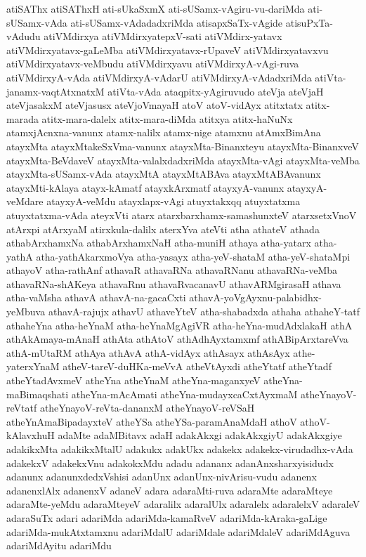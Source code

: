 {atiSAThx
atiSAThxH
ati-sUkaSxmX
ati-sUSamx-vAgiru-vu-dariMda
ati-sUSamx-vAda
ati-sUSamx-vAdadadxriMda
atisapxSaTx-vAgide
atisuPxTa-vAdudu
atiVMdirxya
atiVMdirxyatepxV-sati
atiVMdirx-yatavx
atiVMdirxyatavx-gaLeMba
atiVMdirxyatavx-rUpaveV
atiVMdirxyatavxvu
atiVMdirxyatavx-veMbudu
atiVMdirxyavu
atiVMdirxyA-vAgi-ruva
atiVMdirxyA-vAda
atiVMdirxyA-vAdarU
atiVMdirxyA-vAdadxriMda
atiVta-janamx-vaqtAtxnatxM
atiVta-vAda
ataqpitx-yAgiruvudo
ateVja
ateVjaH
ateVjasakxM
ateVjasusx
ateVjoVmayaH
atoV
atoV-vidAyx
atitxtatx
atitx-marada
atitx-mara-dalelx
atitx-mara-diMda
atitxya
atitx-haNuNx
atamxjAcnxna-vanunx
atamx-nalilx
atamx-nige
atamxnu
atAmxBimAna
atayxMta
atayxMtakeSxVma-vanunx
atayxMta-Binanxteyu
atayxMta-BinanxveV
atayxMta-BeVdaveV
atayxMta-valalxdadxriMda
atayxMta-vAgi
atayxMta-veMba
atayxMta-sUSamx-vAda
atayxMtA
atayxMtABAva
atayxMtABAvanunx
atayxMti-kAlaya
atayx-kAmatf
atayxkArxmatf
atayxyA-vanunx
atayxyA-veMdare
atayxyA-veMdu
atayxlapx-vAgi
atuyxtakxqq
atuyxtatxma
atuyxtatxma-vAda
ateyxVti
atarx
atarxbarxhamx-samashunxteV
atarxsetxVnoV
atArxpi
atArxyaM
atirxkula-dalilx
aterxYva
ateVti
atha
athateV
athada
athabArxhamxNa
athabArxhamxNaH
atha-muniH
athaya
atha-yatarx
atha-yathA
atha-yathAkarxmoVya
atha-yasayx
atha-yeV-shataM
atha-yeV-shataMpi
athayoV
atha-rathAnf
athavaR
athavaRNa
athavaRNanu
athavaRNa-veMba
athavaRNa-shAKeya
athavaRnu
athavaRvacanavU
athavARMgirasaH
athava
atha-vaMsha
athavA
athavA-na-gacaCxti
athavA-yoVgAyxnu-palabidhx-yeMbuva
athavA-rajujx
athavU
athaveYteV
atha-shabadxda
athaha
athaheY-tatf
athaheYna
atha-heYnaM
atha-heYnaMgAgiVR
atha-heYna-mudAdxlakaH
athA
athAkAmaya-mAnaH
athAta
athAtoV
athAdhAyxtamxmf
athABipArxtareVva
athA-mUtaRM
athAya
athAvA
athA-vidAyx
athAsayx
athAsAyx
athe-yaterxYnaM
atheV-tareV-duHKa-meVvA
atheVtAyxdi
atheYtatf
atheYtadf
atheYtadAvxmeV
atheYna
atheYnaM
atheYna-maganxyeV
atheYna-maBimaqshati
atheYna-mAcAmati
atheYna-mudayxcaCxtAyxmaM
atheYnayoV-reVtatf
atheYnayoV-reVta-dananxM
atheYnayoV-reVSaH
atheYnAmaBipadayxteV
atheYSa
atheYSa-paramAnaMdaH
athoV
athoV-kAlavxhuH
adaMte
adaMBitavx
adaH
adakAkxgi
adakAkxgiyU
adakAkxgiye
adakikxMta
adakikxMtalU
adakukx
adakUkx
adakekx
adakekx-virudadhx-vAda
adakekxV
adakekxVnu
adakokxMdu
adadu
adananx
adanAnxsharxyisidudx
adanunx
adanunxdedxVshisi
adanUnx
adanUnx-nivArisu-vudu
adanenx
adanenxlAlx
adanenxV
adaneV
adara
adaraMti-ruva
adaraMte
adaraMteye
adaraMte-yeMdu
adaraMteyeV
adaralilx
adaralUlx
adaralelx
adaralelxV
adaraleV
adaraSuTx
adari
adariMda
adariMda-kamaRveV
adariMda-kAraka-gaLige
adariMda-mukAtxtamxnu
adariMdalU
adariMdale
adariMdaleV
adariMdAguva
adariMdAyitu
adariMdu
}
